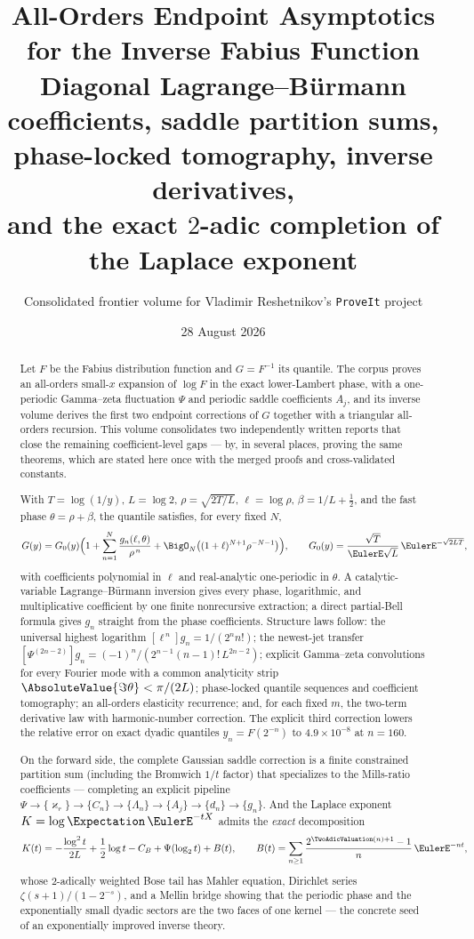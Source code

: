 \documentclass[11pt,oneside]{article}
\title{\bfseries All-Orders Endpoint Asymptotics\\
for the Inverse Fabius Function\\[0.45em]
\large Diagonal Lagrange--B\"urmann coefficients, saddle partition sums,\\
phase-locked tomography, inverse derivatives,\\
and the exact $2$-adic completion of the Laplace exponent}
\author{Consolidated frontier volume for Vladimir Reshetnikov's \texttt{ProveIt} project}
\date{28 August 2026}
\numberwithin{equation}{section}
\theoremstyle{definition}
\theoremstyle{remark}
\newcommand{\CB}{C_{B}}
\newcommand{\Gzero}{G_0}
\begin{document}
\maketitle

\begin{abstract}
\noindent
Let $F$ be the Fabius distribution function and $G=F^{-1}$ its
quantile.  The corpus proves an all-orders small-$x$ expansion of
$\log F$ in the exact lower-Lambert phase, with a one-periodic
Gamma--zeta fluctuation $\Psi$ and periodic saddle coefficients
$A_j$, and its inverse volume derives the first two endpoint
corrections of $G$ together with a triangular all-orders recursion.
This volume consolidates two independently written reports that close
the remaining coefficient-level gaps --- by, in several places,
proving the same theorems, which are stated here once with the merged
proofs and cross-validated constants.

With $T=\log(1/y)$, $L=\log2$, $\rho=\sqrt{2T/L}$, $\ell=\log\rho$,
$\beta=1/L+\tfrac12$, and the fast phase $\theta=\rho+\beta$, the
quantile satisfies, for every fixed $N$,
\[
 G(y)=\Gzero(y)\Bigl(1+\sum_{n=1}^{N}
 \frac{g_n(\ell,\theta)}{\rho^{\,n}}
 +\BigO_N\bigl((1+\ell)^{N+1}\rho^{-N-1}\bigr)\Bigr),
 \qquad
 \Gzero(y)=\frac{\sqrt T}{\EulerE\sqrt L}\,\EulerE^{-\sqrt{2LT}},
\]
with coefficients polynomial in $\ell$ and real-analytic one-periodic
in $\theta$.  A catalytic-variable Lagrange--B\"urmann inversion
gives every phase, logarithmic, and multiplicative coefficient by one
finite nonrecursive extraction; a direct partial-Bell formula gives
$g_n$ straight from the phase coefficients.  Structure laws follow:
the universal highest logarithm $[\ell^{\,n}]g_n=1/(2^{n}n!)$; the
newest-jet transfer
$[\Psi^{(2n-2)}]g_n=(-1)^{n}/(2^{n-1}(n-1)!\,L^{2n-2})$; explicit
Gamma--zeta convolutions for every Fourier mode with a common
analyticity strip $\AbsoluteValue{\Im\theta}<\pi/(2L)$; phase-locked quantile
sequences and coefficient tomography; an all-orders elasticity
recurrence; and, for each fixed $m$, the two-term derivative law with
harmonic-number correction.  The explicit third correction lowers the
relative error on exact dyadic quantiles $y_n=F(2^{-n})$ to
$4.9\times10^{-8}$ at $n=160$.

On the forward side, the complete Gaussian saddle correction is a
finite constrained partition sum (including the Bromwich
$1/t$ factor) that specializes to the Mills-ratio coefficients ---
completing an explicit pipeline
$\Psi\to\{\varkappa_r\}\to\{C_n\}\to\{\Lambda_n\}\to\{A_j\}\to
\{d_n\}\to\{g_n\}$.  And the Laplace exponent
$K=\log\Expectation\,\EulerE^{-tX}$ admits the \emph{exact} decomposition
\[
 K(t)=-\frac{\log^2t}{2L}+\frac12\log t-\CB
 +\Psi(\log_2t)+B(t),
 \qquad
 B(t)=\sum_{n\ge1}\frac{2^{\TwoAdicValuation(n)+1}-1}{n}\,\EulerE^{-nt},
\]
whose $2$-adically weighted Bose tail has Mahler equation, Dirichlet
series $\zeta(s+1)/(1-2^{-s})$, and a Mellin bridge showing that the
periodic phase and the exponentially small dyadic sectors are the two
faces of one kernel --- the concrete seed of an exponentially
improved inverse theory.


\end{abstract}
\end{document}
